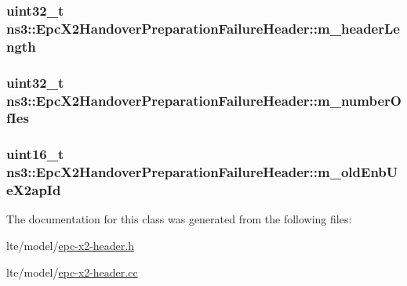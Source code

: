 \subsubsection[{\texorpdfstring{m\+\_\+header\+Length}{m_headerLength}}]{\setlength{\rightskip}{0pt plus 5cm}uint32\+\_\+t ns3\+::\+Epc\+X2\+Handover\+Preparation\+Failure\+Header\+::m\+\_\+header\+Length\hspace{0.3cm}{\ttfamily [private]}}\hypertarget{classns3_1_1EpcX2HandoverPreparationFailureHeader_a8c82d898bfa520fa8a17454243d0dc4b}{}\label{classns3_1_1EpcX2HandoverPreparationFailureHeader_a8c82d898bfa520fa8a17454243d0dc4b}
\subsubsection[{\texorpdfstring{m\+\_\+number\+Of\+Ies}{m_numberOfIes}}]{\setlength{\rightskip}{0pt plus 5cm}uint32\+\_\+t ns3\+::\+Epc\+X2\+Handover\+Preparation\+Failure\+Header\+::m\+\_\+number\+Of\+Ies\hspace{0.3cm}{\ttfamily [private]}}\hypertarget{classns3_1_1EpcX2HandoverPreparationFailureHeader_ab530f263ee47d7e93a0acaeeaf30ded3}{}\label{classns3_1_1EpcX2HandoverPreparationFailureHeader_ab530f263ee47d7e93a0acaeeaf30ded3}
\subsubsection[{\texorpdfstring{m\+\_\+old\+Enb\+Ue\+X2ap\+Id}{m_oldEnbUeX2apId}}]{\setlength{\rightskip}{0pt plus 5cm}uint16\+\_\+t ns3\+::\+Epc\+X2\+Handover\+Preparation\+Failure\+Header\+::m\+\_\+old\+Enb\+Ue\+X2ap\+Id\hspace{0.3cm}{\ttfamily [private]}}\hypertarget{classns3_1_1EpcX2HandoverPreparationFailureHeader_ab5eea0838833dc61a698ed04070e06d5}{}\label{classns3_1_1EpcX2HandoverPreparationFailureHeader_ab5eea0838833dc61a698ed04070e06d5}


The documentation for this class was generated from the following files\+:\begin{DoxyCompactItemize}
\item 
lte/model/\hyperlink{epc-x2-header_8h}{epc-\/x2-\/header.\+h}\item 
lte/model/\hyperlink{epc-x2-header_8cc}{epc-\/x2-\/header.\+cc}\end{DoxyCompactItemize}
